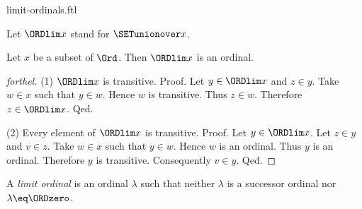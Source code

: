 \documentclass{naproche-library}
\begin{document}
\begin{smodule}[title=Limit Ordinals]{limit-ordinals.ftl}

\begin{convention}[forthel]
  Let $\ORDlim x$ stand for $\SETunionover x$.
\end{convention}

\begin{proposition}[forthel,id=SET_THEORY_02_7202164443185152]
  Let $x$ be a subset of $\Ord$.
  Then $\ORDlim x$ is an ordinal.
\end{proposition}
\begin{proof}[forthel]
  (1) $\ORDlim x$ is transitive. \newline
  Proof.
    Let $y \in \ORDlim x$ and $z \in y$.
    Take $w \in x$ such that $y \in w$.
    Hence $w$ is transitive.
    Thus $z \in w$.
    Therefore $z \in \ORDlim x$.
  Qed.

  (2) Every element of $\ORDlim x$ is transitive. \newline
  Proof.
    Let $y \in \ORDlim x$.
    Let $z \in y$ and $v \in z$.
    Take $w \in x$ such that $y \in w$.
    Hence $w$ is an ordinal.
    Thus $y$ is an ordinal.
    Therefore $y$ is transitive.
    Consequently $v \in y$.
  Qed.
\end{proof}

\begin{definition}[forthel,id=SET_THEORY_02_7678388934279168]
  A \emph{limit ordinal} is an ordinal $\lambda$ such that neither $\lambda$ is a successor ordinal nor $\lambda \eq \ORDzero$.
\end{definition}
\end{smodule}
\end{document}
